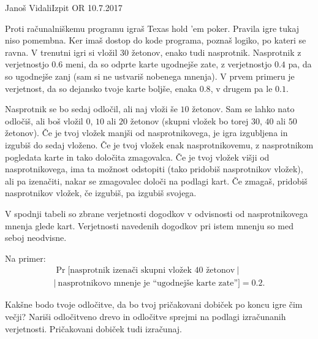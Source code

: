 \begin{naloga}{Janoš Vidali}{Izpit OR 10.7.2017}
\begin{vprasanje}[poker]
Proti računalniškemu programu igraš Texas hold 'em poker.
Pravila igre tukaj niso pomembna.
Ker imaš dostop do kode programa, poznaš logiko, po kateri se ravna.
V trenutni igri si vložil $30$ žetonov, enako tudi nasprotnik.
Nasprotnik z verjetnostjo $0.6$ meni, da so odprte karte ugodnejše zate,
z verjetnostjo $0.4$ pa, da so ugodnejše zanj
(sam si ne ustvariš nobenega mnenja).
V prvem primeru je verjetnost, da so dejansko tvoje karte boljše, enaka $0.8$,
v drugem pa le $0.1$.

Nasprotnik se bo sedaj odločil, ali naj vloži še $10$ žetonov.
Sam se lahko nato odločiš, ali boš vložil $0$, $10$ ali $20$ žetonov
(skupni vložek bo torej $30$, $40$ ali $50$ žetonov).
Če je tvoj vložek manjši od nasprotnikovega,
je igra izgubljena in izgubiš do sedaj vloženo.
Če je tvoj vložek enak na\-sprot\-ni\-ko\-ve\-mu,
z nasprotnikom pogledata karte in tako določita zmagovalca.
Če je tvoj vložek višji od nasprotnikovega,
ima ta možnost odstopiti (tako pridobiš nasprotnikov vložek),
ali pa izenačiti, nakar se zmagovalec določi na podlagi kart.
Če zmagaš, pridobiš nasprotnikov vložek,
če izgubiš, pa izgubiš svojega.

V spodnji tabeli so zbrane verjetnosti dogodkov
v odvisnosti od nasprotnikovega mnenja glede kart.
Verjetnosti navedenih dogodkov pri istem mnenju so med seboj neodvisne.
\begin{center}
\end{center}
Na primer:
\begin{multline*}
\Pr[\text{nasprotnik izenači skupni vložek $40$ žetonov} \ | \\
| \ \text{nasprotnikovo mnenje je ``ugodnejše karte zate''}] = 0.2 .
\end{multline*}

Kakšne bodo tvoje odločitve,
da bo tvoj pričakovani dobiček po koncu igre čim večji?
Nariši odločitveno drevo
in odločitve sprejmi na podlagi izračunanih verjetnosti.
Pričakovani dobiček tudi izračunaj.
\end{vprasanje}
\begin{odgovor}
\end{odgovor}
\end{naloga}


